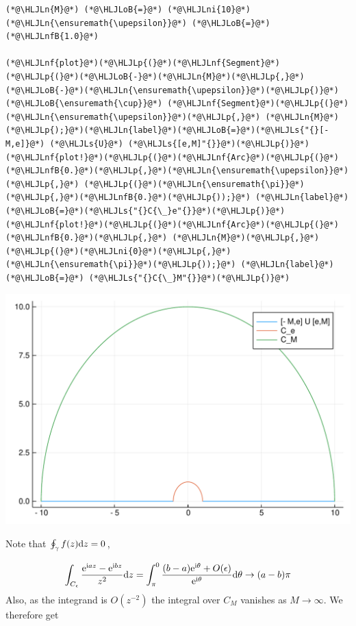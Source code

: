 \documentclass[12pt,a4paper]{article}
\newcommand{\HLJLn}[1]{#1}
\newcommand{\HLJLnf}[1]{\textcolor[RGB]{66,102,213}{#1}}
\newcommand{\HLJLs}[1]{\textcolor[RGB]{201,61,57}{#1}}
\newcommand{\HLJLnfB}[1]{\textcolor[RGB]{59,151,46}{#1}}
\newcommand{\HLJLni}[1]{\textcolor[RGB]{59,151,46}{#1}}
\newcommand{\HLJLoB}[1]{\textcolor[RGB]{102,102,102}{\textbf{#1}}}
\newcommand{\HLJLp}[1]{#1}
\def\D{ {\rm d} }
\def\I{ {\rm i} }
\def\E{ {\rm e} }
\def\upepsilon{\varepsilon}
\def\dz{\D z}
\begin{document}
\begin{lstlisting}
(*@\HLJLn{M}@*) (*@\HLJLoB{=}@*) (*@\HLJLni{10}@*)
(*@\HLJLn{\ensuremath{\upepsilon}}@*) (*@\HLJLoB{=}@*) (*@\HLJLnfB{1.0}@*)

(*@\HLJLnf{plot}@*)(*@\HLJLp{(}@*)(*@\HLJLnf{Segment}@*)(*@\HLJLp{(}@*)(*@\HLJLoB{-}@*)(*@\HLJLn{M}@*)(*@\HLJLp{,}@*) (*@\HLJLoB{-}@*)(*@\HLJLn{\ensuremath{\upepsilon}}@*)(*@\HLJLp{)}@*) (*@\HLJLoB{\ensuremath{\cup}}@*) (*@\HLJLnf{Segment}@*)(*@\HLJLp{(}@*)(*@\HLJLn{\ensuremath{\upepsilon}}@*)(*@\HLJLp{,}@*) (*@\HLJLn{M}@*)(*@\HLJLp{);}@*)(*@\HLJLn{label}@*)(*@\HLJLoB{=}@*)(*@\HLJLs{"{}[-M,e]}@*) (*@\HLJLs{U}@*) (*@\HLJLs{[e,M]"{}}@*)(*@\HLJLp{)}@*)
(*@\HLJLnf{plot!}@*)(*@\HLJLp{(}@*)(*@\HLJLnf{Arc}@*)(*@\HLJLp{(}@*)(*@\HLJLnfB{0.}@*)(*@\HLJLp{,}@*)(*@\HLJLn{\ensuremath{\upepsilon}}@*)(*@\HLJLp{,}@*) (*@\HLJLp{(}@*)(*@\HLJLn{\ensuremath{\pi}}@*)(*@\HLJLp{,}@*)(*@\HLJLnfB{0.}@*)(*@\HLJLp{));}@*) (*@\HLJLn{label}@*)(*@\HLJLoB{=}@*)(*@\HLJLs{"{}C{\_}e"{}}@*)(*@\HLJLp{)}@*)
(*@\HLJLnf{plot!}@*)(*@\HLJLp{(}@*)(*@\HLJLnf{Arc}@*)(*@\HLJLp{(}@*)(*@\HLJLnfB{0.}@*)(*@\HLJLp{,}@*) (*@\HLJLn{M}@*)(*@\HLJLp{,}@*) (*@\HLJLp{(}@*)(*@\HLJLni{0}@*)(*@\HLJLp{,}@*)(*@\HLJLn{\ensuremath{\pi}}@*)(*@\HLJLp{));}@*) (*@\HLJLn{label}@*) (*@\HLJLoB{=}@*) (*@\HLJLs{"{}C{\_}M"{}}@*)(*@\HLJLp{)}@*)
\end{lstlisting}

\includegraphics[width=\linewidth]{figures/Solutions1_13_1.pdf}

Note that $\oint_\gamma f(z) \dz = 0$, 

\[
\int_{C_\epsilon} {\E^{\I a z } - \E^{\I b z} \over z^2} \dz =
 \int_\pi^0 { (b-a) \E^{\I \theta}  + O(\epsilon) \over \E^{ \I \theta}} \D\theta \rightarrow (a-b) \pi
\]
Also, as the integrand is $O(z^{-2})$ the integral over $C_M$ vanishes as $M \rightarrow \infty$. We therefore get
\end{document}
